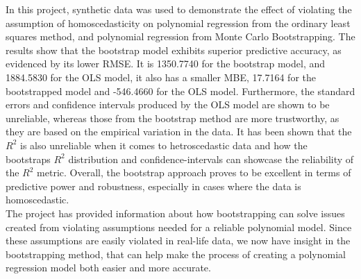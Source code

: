In this project, synthetic data was used to demonstrate the effect of violating the assumption of homoscedasticity on polynomial regression from the ordinary least squares method, and polynomial regression from Monte Carlo Bootstrapping. The results show that the bootstrap model exhibits superior predictive accuracy, as evidenced by its lower RMSE. It is 1350.7740 for the bootstrap model, and 1884.5830 for the OLS model, it also has a smaller MBE, 17.7164 for the bootstrapped model and -546.4660 for the OLS model. Furthermore, the standard errors and confidence intervals produced by the OLS model are shown to be unreliable, whereas those from the bootstrap method are more trustworthy, as they are based on the empirical variation in the data. It has been shown that the $R^2$ is also unreliable when it comes to hetroscedastic data and how the bootstraps $R^2$ distribution and confidence-intervals can showcase the reliability of the $R^2$ metric. Overall, the bootstrap approach proves to be excellent in terms of predictive power and robustness, especially in cases where the data is homoscedastic.\\

\noindent The project has provided information about how bootstrapping can solve issues created from violating assumptions needed for a reliable polynomial model. Since these assumptions are easily violated in real-life data, we now have insight in the bootstrapping method, that can help make the process of creating a polynomial regression model both easier and more accurate. 